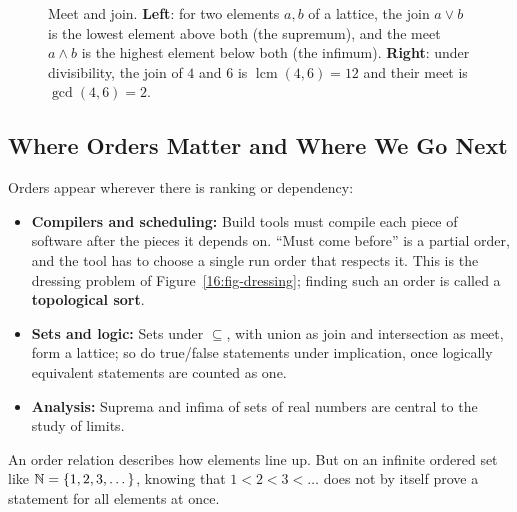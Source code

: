 \begin{figure}[htbp]
\caption{Meet and join. \textbf{Left}: for two elements $a, b$ of a lattice, the join $a \lor b$ is the lowest element above both (the supremum), and the meet $a \land b$ is the highest element below both (the infimum). \textbf{Right}: under divisibility, the join of $4$ and $6$ is $\operatorname{lcm}(4, 6) = 12$ and their meet is $\gcd(4, 6) = 2$.}
\label{16:fig-meet-join}
\end{figure}

\subsection{Where Orders Matter and Where We Go Next}

Orders appear wherever there is ranking or dependency:
\begin{itemize}
\item \textbf{Compilers and scheduling:} Build tools must compile each piece of software after the pieces it depends on. ``Must come before'' is a partial order, and the tool has to choose a single run order that respects it. This is the dressing problem of Figure~\ref{16:fig-dressing}; finding such an order is called a \textbf{topological sort}.
\item \textbf{Sets and logic:} Sets under $\subseteq$, with union as join and intersection as meet, form a lattice; so do true/false statements under implication, once logically equivalent statements are counted as one.
\item \textbf{Analysis:} Suprema and infima of sets of real numbers are central to the study of limits.
\end{itemize}

An order relation describes how elements line up. But on an infinite ordered set like $\mathbb{N} = \{1, 2, 3, \dots\}$, knowing that $1 < 2 < 3 < \dots$ does not by itself prove a statement for all elements at once.

